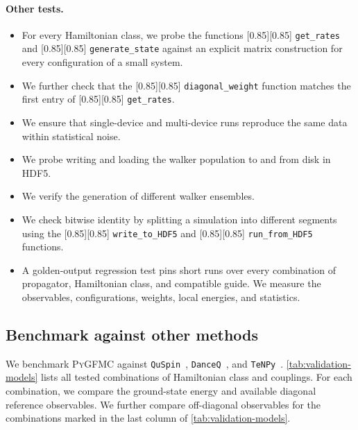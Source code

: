 \documentclass{SciPost}
\newcommand{\pyinline}[1]{\begingroup\setlength{\fboxsep}{0pt}%
  \colorbox{gray!15}{\raisebox{0pt}[0.85\ht\strutbox][0.85\dp\strutbox]{%
    \hspace{1pt}\lstinline{#1}\hspace{1pt}}}\endgroup}
\providecommand{\PyGFMC}{\textsc{PyGFMC}}
\begin{document}
\paragraph{Other tests.}
\begin{itemize}
	\item For every Hamiltonian class, we probe the functions \pyinline{get_rates} and \pyinline{generate_state} against an explicit matrix construction for every configuration of a small system.
		
	\item We further check that the \pyinline{diagonal_weight} function matches the first entry of \pyinline{get_rates}.

	\item We ensure that single-device and multi-device runs reproduce the same data within statistical noise.

	\item We probe writing and loading the walker population to and from disk in HDF5.

	\item We verify the generation of different walker ensembles.

	\item We check bitwise identity by splitting a simulation into different segments using the \pyinline{write_to_HDF5} and \pyinline{run_from_HDF5} functions.
	\item A golden-output regression test pins short runs over every combination of propagator, Hamiltonian class, and compatible guide.
		We measure the observables, configurations, weights, local energies, and statistics.
\end{itemize}



\subsection{Benchmark against other methods}
We benchmark \PyGFMC{} against \texttt{QuSpin}~\cite{weinberg_quspin_2017,weinberg_quspin_2019}, \texttt{DanceQ}~\cite{schaefer_danceQ_2025,DanceQ_code}, and \texttt{TeNPy}~\cite{tenpy2024}.
%
\autoref{tab:validation-models} lists all tested combinations of Hamiltonian class and couplings.
%
For each combination, we compare the ground-state energy and available diagonal reference observables.
%
We further compare off-diagonal observables for the combinations marked in the last column of \autoref{tab:validation-models}.
\end{document}
